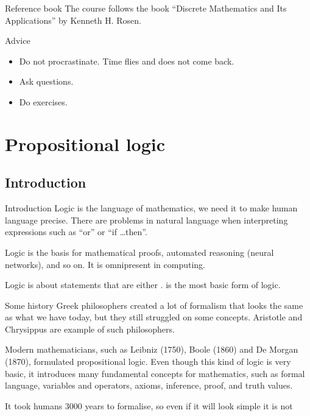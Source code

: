 \documentclass{article}
\begin{document}
\begin{parag}{Reference book}
    The course follows the book ``Discrete Mathematics and Its Applications'' by Kenneth H. Rosen.
\end{parag}

\begin{parag}{Advice}
\begin{itemize}[left=0pt]
    \item Do not procrastinate. Time flies and does not come back.
    \item Ask questions.
    \item Do exercises.
\end{itemize}
\end{parag}


\section{Propositional logic}

\subsection{Introduction}
\begin{parag}{Introduction}
    Logic is the language of mathematics, we need it to make human language precise. There are problems in natural language when interpreting expressions such as ``or'' or ``if \ldots then''.

    Logic is the basis for mathematical proofs, automated reasoning (neural networks), and so on. It is omnipresent in computing.

    Logic is about statements that are either .  is the most basic form of logic.
\end{parag}

\begin{parag}{Some history}
    Greek philosophers created a lot of formalism that looks the same as what we have today, but they still struggled on some concepts. Aristotle and Chrysippus are example of such philosophers. 

    Modern mathematicians, such as Leibniz (1750), Boole (1860) and De Morgan (1870), formulated propositional logic. Even though this kind of logic is very basic, it introduces many fundamental concepts for mathematics, such as formal language, variables and operators, axioms, inference, proof, and truth values. 
    
    It took humans 3000 years to formalise, so even if it will look simple it is not
\end{parag}
\end{document}
